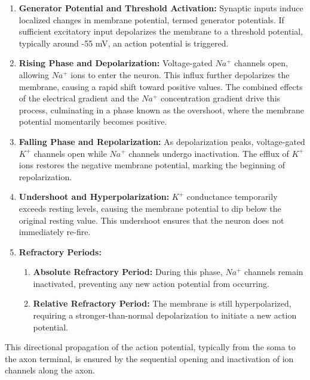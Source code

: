 \begin{enumerate}
    \item \textbf{Generator Potential and Threshold Activation:} Synaptic inputs induce localized changes in 
    membrane potential, termed generator potentials. If sufficient excitatory input depolarizes 
    the membrane to a threshold potential, typically around -55 mV, an action potential is triggered.
    \item \textbf{Rising Phase and Depolarization:} Voltage-gated $Na^{+}$ channels open, allowing $Na^{+}$ 
    ions to enter the neuron. This influx further depolarizes the membrane, causing a rapid 
    shift toward positive values.
    The combined effects of the electrical gradient and the $Na^{+}$ concentration gradient drive this 
    process, culminating in a phase known as the overshoot, where the membrane potential 
    momentarily becomes positive.
    \item \textbf{Falling Phase and Repolarization:} As depolarization peaks, voltage-gated $K^{+}$ channels 
    open while $Na^{+}$ channels undergo inactivation. The efflux of $K^{+}$ ions restores the negative membrane 
    potential, marking the beginning of repolarization.
    \item \textbf{Undershoot and Hyperpolarization:} $K^{+}$ conductance temporarily exceeds resting levels, causing the 
    membrane potential to dip below the original resting value. This undershoot ensures that the 
    neuron does not immediately re-fire.
    \item \textbf{Refractory Periods:}
    \begin{enumerate}
        \item \textbf{Absolute Refractory Period:} During this phase, $Na^{+}$ channels remain inactivated, preventing any 
        new action potential from occurring.
        \item \textbf{Relative Refractory Period:} The membrane is still hyperpolarized, requiring a 
        stronger-than-normal depolarization to initiate a new action potential.
    \end{enumerate}
\end{enumerate}

This directional propagation of the action potential, typically from the soma to the axon terminal, is ensured 
by the sequential opening and inactivation of ion channels along the axon.

